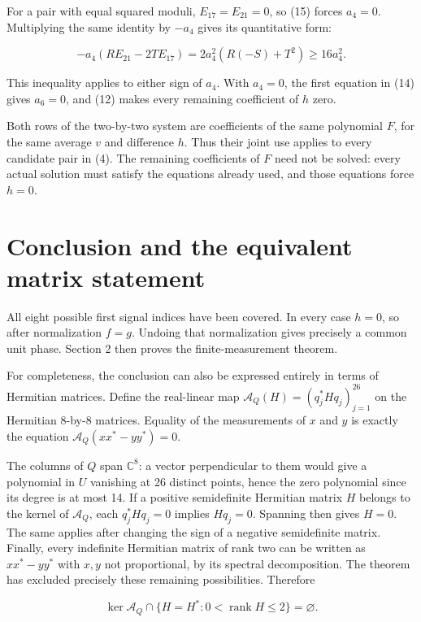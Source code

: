 For a pair with equal squared moduli, \(E_{17}=E_{21}=0\), so (15)
forces \(a_4=0\). Multiplying the same identity by \(-a_4\) gives its
quantitative form:

\[
-a_4(RE_{21}-2TE_{17})=2a_4^2(R(-S)+T^2)\ge16a_4^2.
\]

This inequality applies to either sign of \(a_4\). With \(a_4=0\), the
first equation in (14) gives \(a_6=0\), and (12) makes every remaining
coefficient of \(h\) zero.

Both rows of the two-by-two system are coefficients of the same
polynomial \(F\), for the same average \(v\) and difference \(h\). Thus
their joint use applies to every candidate pair in (4). The remaining
coefficients of \(F\) need not be solved: every actual solution must
satisfy the equations already used, and those equations force \(h=0\).

\section{Conclusion and the equivalent matrix
statement}\label{conclusion-and-the-equivalent-matrix-statement}

All eight possible first signal indices have been covered. In every case
\(h=0\), so after normalization \(f=g\). Undoing that normalization
gives precisely a common unit phase. Section 2 then proves the
finite-measurement theorem.

For completeness, the conclusion can also be expressed entirely in terms
of Hermitian matrices. Define the real-linear map
\(\mathcal A_Q(H)=(q_j^*Hq_j)_{j=1}^{26}\) on the Hermitian
\(8\)-by-\(8\) matrices. Equality of the measurements of \(x\) and \(y\)
is exactly the equation \(\mathcal A_Q(xx^*-yy^*)=0\).

The columns of \(Q\) span \(\mathbb C^8\): a vector perpendicular to
them would give a polynomial in \(U\) vanishing at 26 distinct points,
hence the zero polynomial since its degree is at most 14. If a positive
semidefinite Hermitian matrix \(H\) belongs to the kernel of
\(\mathcal A_Q\), each \(q_j^*Hq_j=0\) implies \(Hq_j=0\). Spanning then
gives \(H=0\). The same applies after changing the sign of a negative
semidefinite matrix. Finally, every indefinite Hermitian matrix of rank
two can be written as \(xx^*-yy^*\) with \(x,y\) not proportional, by
its spectral decomposition. The theorem has excluded precisely these
remaining possibilities. Therefore

\[
\ker\mathcal A_Q\cap\{H=H^*:0<\operatorname{rank}H\le2\}=\varnothing.
\]

